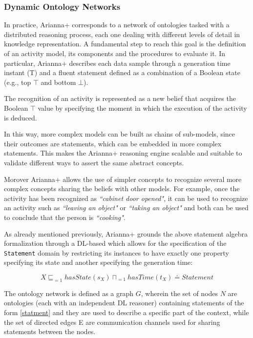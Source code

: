 \documentclass{thesisreport}
\begin{document}
 \subsubsection{Dynamic Ontology Networks}
 In practice, Arianna+ corresponds to a network of ontologies tasked with a distributed reasoning process, each one dealing with different levels of detail in knowledge representation. 
 A fundamental step to reach this goal is  the definition of an activity model, its components and the procedures to evaluate it. In particular, Arianna+ describes each data sample through a generation time instant (T) and a fluent statement defined as a combination of a Boolean state (e.g., top $\top$ and bottom $\bot$).
 
 The recognition of an activity is represented as a new belief that acquires the Boolean $\top$ value by specifying the moment in which the execution of the activity is deduced.
 
 In this way, more complex models can be built as chains of sub-models, since their outcomes are statements, which can be embedded in more complex statements.
 This makes the Arianna+ reasoning engine scalable and suitable to validate different ways to assert the same abstract concepts.
 
Morover Arianna+ allows the use of simpler concepts to recognize several more complex concepts sharing the beliefs  with other models. For example, once the activity has been recognized as \textit{``cabinet door opened"}, it can be used to recognize an activity such as \textit{``leaving an object"} or \textit{``taking an object"} and both can be used to conclude that the person is \textit{``cooking"}.

 As already mentioned previously, Arianna+ grounds the above statement algebra formalization through a DL-based which allows for the specification of the \texttt{Statement} domain by restricting its instances to have exactly one property specifying its state and another specifying the generation time:
 
 \begin{equation}
     X \sqsubseteq_{=1} hasState(s_X) \sqcap_{=1} hasTime(t_X) \doteq Statement
     \label{statment}
 \end{equation}
 
 The ontology network is defined as a graph $G$, wherein the set of nodes $N$ are ontologies (each with an independent DL reasoner) containing statements of the form \ref{statment} and they are used to describe a specific part of the context, while the set of directed edges E are communication channels used for sharing statements between the nodes.
 
\end{document}
